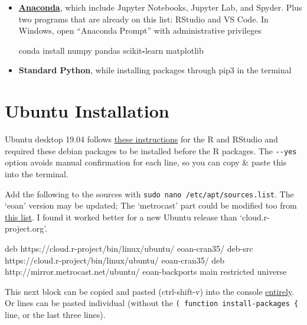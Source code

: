 \documentclass[
]{book}
\newenvironment{Shaded}{\begin{snugshade}}{\end{snugshade}}
\newcommand{\ExtensionTok}[1]{#1}
\newcommand{\NormalTok}[1]{#1}
\newcommand{\OperatorTok}[1]{\textcolor[rgb]{0.81,0.36,0.00}{\textbf{#1}}}
\begin{document}
\begin{itemize}
  \begin{itemize}
  \item
    \textbf{\href{https://www.anaconda.com/distribution/\#download-section}{Anaconda}}, which include Jupyter Notebooks, Jupyter Lab, and Spyder. Plus two programs that are already on this list: RStudio and VS Code. In Windows, open ``Anaconda Prompt'' with administrative privileges

\begin{Shaded}
\begin{Highlighting}[]
\NormalTok{conda install numpy pandas scikit}\OperatorTok{{-}}\NormalTok{learn matplotlib}
\end{Highlighting}
\end{Shaded}
  \item
    \textbf{Standard Python}, while installing packages through pip3 in the terminal
  \end{itemize}
\end{itemize}

\hypertarget{installation-ubuntu}{%
\section{Ubuntu Installation}\label{installation-ubuntu}}

Ubuntu desktop 19.04 follows \href{https://askubuntu.com/a/862520/153921}{these instructions} for the R and RStudio and required these debian packages to be installed before the R packages. The \texttt{-\/-yes} option avoids manual confirmation for each line, so you can copy \& paste this into the terminal.

Add the following to the sources with \texttt{sudo\ nano\ /etc/apt/sources.list}. The `eoan' version may be updated; The `metrocast' part could be modified too from \href{https://launchpad.net/ubuntu/+archivemirrors}{this list}. I found it worked better for a new Ubuntu release than `cloud.r-project.org'.

\begin{Shaded}
\begin{Highlighting}[]
\ExtensionTok{deb}\NormalTok{ https://cloud.r{-}project/bin/linux/ubuntu/ eoan{-}cran35/ }
\ExtensionTok{deb{-}src}\NormalTok{ https://cloud.r{-}project/bin/linux/ubuntu/ eoan{-}cran35/ }
\ExtensionTok{deb}\NormalTok{ http://mirror.metrocast.net/ubuntu/ eoan{-}backports main restricted universe}
\end{Highlighting}
\end{Shaded}

This next block can be copied and pasted (ctrl-shift-v) into the console \href{https://stackoverflow.com/a/43164204}{entirely}. Or lines can be pasted individual (without the \texttt{(\ function\ install-packages\ \{} line, or the last three lines).
\end{document}
